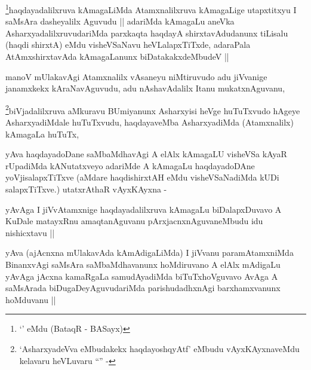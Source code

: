 
\begin{artha} 
\footnote{`\stext' eMdu (BataqR - BASayx)}haqdayadalilxruva kAmagaLiMda Atamxnalilxruva kAmagaLige
utapxtitxyu I saMsAra dasheyalilx Aguvudu || adariMda kAmagaLu aneVka
AsharxyadalilxruvudariMda parxkaqta haqdayA shirxtavAdudanunx tiLisalu
(haqdi shirxtA) eMdu visheVSaNavu heVLalapxTiTxde, adaraPala
AtAmxshirxtavAda kAmagaLanunx biDatakakxdeMbudeV ||
\end{artha}

\begin{artha}
manoV mUlakavAgi Atamxnalilx vAsaneyu niMtiruvudo adu jiVvanige
janamxkekx kAraNavAguvudu, adu nAshavAdalilx Itanu mukatxnAguvanu,
\end{artha}


\begin{artha}
\footnote{`AsharxyadeVva eMbudakekx haqdayoshqyAtf' eMbudu
  vAyxKAyxnaveMdu kelavaru heVLuvaru ``\stext'' -}biVjadalilxruva aMkuravu BUmiyanunx Asharxyisi heVge
huTuTxvudo hAgeye AsharxyadiMdale huTuTxvudu, haqdayaveMba
AsharxyadiMda (Atamxnalilx) kAmagaLa huTuTx,
\end{artha}


\begin{artha}
yAva haqdayadoDane saMbaMdhavAgi A elAlx kAmagaLU visheVSa kAyaR
rUpadiMda kANutatxveyo adariMde A kAmagaLu haqdayadoDAne
yoVjisalapxTiTxve (aMdare haqdishirxtAH eMdu visheVSaNadiMda kUDi
salapxTiTxve.) utatxrAthaR vAyxKAyxna -
\end{artha}

\begin{artha}
yAvAga I jiVvAtamxnige haqdayadalilxruva kAmagaLu biDalapxDuvavo A
KuDale matayxRnu amaqtanAguvanu pArxjacnxnAguvaneMbudu idu nishicxtavu ||
\end{artha}

\begin{artha}
yAva (ajAcnxna mUlakavAda kAmAdigaLiMda) I jiVvanu paramAtamxniMda
BinanxvAgi saMsAra saMbaMdhavanunx hoMdiruvano A elAlx mAdigaLu yAvAga
jAcxna kamaRgaLa samudAyadiMda biTuTxhoVguvavo AvAga A saMsArada
biDugaDeyAguvudariMda parishudadhxnAgi barxhamxvanunx hoMduvanu ||
\end{artha}

